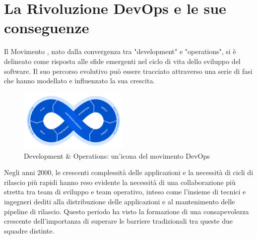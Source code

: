 \section{La Rivoluzione DevOps e le sue conseguenze}

Il Movimento , nato dalla convergenza tra "development" e "operations", si è delineato come risposta alle sfide emergenti nel ciclo di vita dello sviluppo del software. Il suo percorso evolutivo può essere tracciato attraverso una serie di fasi che hanno modellato e influenzato la sua crescita.

\begin{figure}[h]
    \centering
    \includegraphics[width=200px]{figures/ch1/devops-flow.png}
    \caption[Development \& Operations: un'icona del movimento DevOps]{Development \& Operations: un'icona del movimento DevOps}
    \label{fig:cha1:devops}
\end{figure}

Negli anni 2000, le crescenti complessità delle applicazioni e la necessità di cicli di rilascio più rapidi hanno reso evidente la necessità di una collaborazione più stretta tra team di sviluppo e team operativo, inteso come l'insieme di tecnici e ingegneri dediti alla distribuzione delle applicazioni e al mantenimento delle pipeline di rilascio. Questo periodo ha visto la formazione di una consapevolezza crescente dell'importanza di superare le barriere tradizionali tra queste due squadre distinte.

